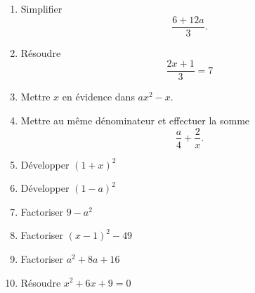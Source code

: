 \begin{exercice}
\begin{multicols}{2}
\begin{enumerate}
            \item
                Simplifier
                \begin{equation*}
                    \frac{ 6+12a }{ 3 }.
                \end{equation*}
            \item
                Résoudre
                \begin{equation*}
                    \frac{ 2x+1 }{ 3 }=7
                \end{equation*}

            \item
                Mettre \( x\) en évidence dans \( ax^2-x\).
            \item
                Mettre au même dénominateur et effectuer la somme
                \begin{equation*}
                    \frac{ a }{ 4 }+\frac{ 2 }{ x }.
                \end{equation*}

            \item
                 Développer \( (1+x)^2\)
             \item
                 Développer \( (1-a)^2\)
             \item
                 Factoriser \( 9-a^2\)
             \item
                 Factoriser \( (x-1)^2-49\)
             \item
                 Factoriser \( a^2+8a+16\)
             \item
                 Résoudre \( x^2+6x+9=0\)

         \end{enumerate}
             \end{multicols}
\end{exercice}

\newcommand{\CaptionFigBpCNVm}{figure de l'exercice \ref{exosmath-0018}} 

